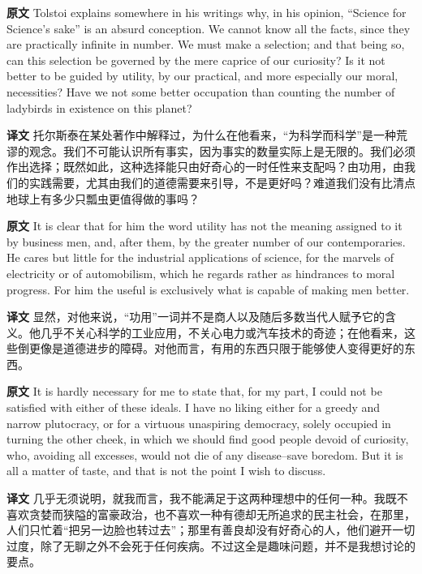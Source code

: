 \documentclass[UTF8,zihao=-4]{ctexart}
\newcommand{\BodyFont}{\fontsize{10.5pt}{15.5pt}\selectfont}
\newcommand{\origlabel}{\textbf{原文}\quad}
\newcommand{\translabel}{\textbf{译文}\quad}
\newenvironment{enblock}{\par\noindent\begingroup\BodyFont\origlabel}{\par\endgroup}
\newenvironment{zhblock}{\par\noindent\begingroup\BodyFont\translabel}{\par\endgroup\vspace{0.35em}}
\begin{document}
\begin{enblock}
Tolstoi explains somewhere in his writings why, in his opinion, “Science for Science's sake” is an absurd conception. We cannot know all the facts, since they are practically infinite in number. We must make a selection; and that being so, can this selection be governed by the mere caprice of our curiosity? Is it not better to be guided by utility, by our practical, and more especially our moral, necessities? Have we not some better occupation than counting the number of ladybirds in existence on this planet?
\end{enblock}
\begin{zhblock}
托尔斯泰在某处著作中解释过，为什么在他看来，“为科学而科学”是一种荒谬的观念。我们不可能认识所有事实，因为事实的数量实际上是无限的。我们必须作出选择；既然如此，这种选择能只由好奇心的一时任性来支配吗？由功用，由我们的实践需要，尤其由我们的道德需要来引导，不是更好吗？难道我们没有比清点地球上有多少只瓢虫更值得做的事吗？\end{zhblock}

\begin{enblock}
It is clear that for him the word utility has not the meaning assigned to it by business men, and, after them, by the greater number of our contemporaries. He cares but little for the industrial applications of science, for the marvels of electricity or of automobilism, which he regards rather as hindrances to moral progress. For him the useful is exclusively what is capable of making men better.
\end{enblock}
\begin{zhblock}
显然，对他来说，“功用”一词并不是商人以及随后多数当代人赋予它的含义。他几乎不关心科学的工业应用，不关心电力或汽车技术的奇迹；在他看来，这些倒更像是道德进步的障碍。对他而言，有用的东西只限于能够使人变得更好的东西。\end{zhblock}

\begin{enblock}
It is hardly necessary for me to state that, for my part, I could not be satisfied with either of these ideals. I have no liking either for a greedy and narrow plutocracy, or for a virtuous unaspiring democracy, solely occupied in turning the other cheek, in which we should find good people devoid of curiosity, who, avoiding all excesses, would not die of any disease--save boredom. But it is all a matter of taste, and that is not the point I wish to discuss.
\end{enblock}
\begin{zhblock}
几乎无须说明，就我而言，我不能满足于这两种理想中的任何一种。我既不喜欢贪婪而狭隘的富豪政治，也不喜欢一种有德却无所追求的民主社会，在那里，人们只忙着“把另一边脸也转过去”；那里有善良却没有好奇心的人，他们避开一切过度，除了无聊之外不会死于任何疾病。不过这全是趣味问题，并不是我想讨论的要点。\end{zhblock}
\end{document}
